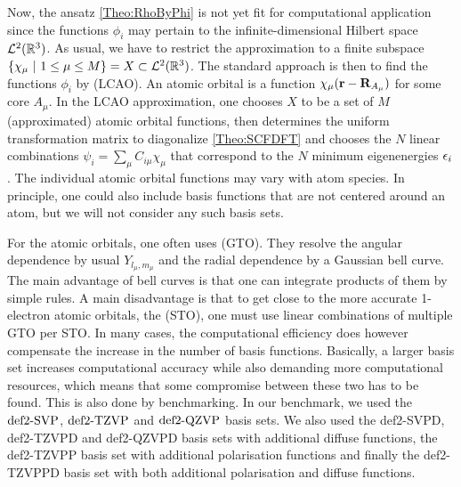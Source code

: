 \documentclass[8.5pt,twoside,twocolumn]{article}
\renewcommand\r{\bo r}
\theoremstyle{standard}
\begin{document}
Now, the ansatz \eqref{Theo:RhoByPhi} is not yet fit for computational application since the
functions $\phi_i$ may pertain to the infinite-dimensional Hilbert space $\mathcal L^2(\mathbb{R}^3)$.
As usual, we have to restrict the approximation to a finite subspace 
$\left\{{\chi_\mu\ |\ 1 \le \mu \le M} \right\} = X \subset \mathcal L^2(\mathbb{R}^3)$.
The standard approach is then to find the functions $\phi_i$ by  (LCAO). An atomic orbital is a function $\chi_\mu(\r - \bo R_{A_\mu})$
for some core $A_\mu$. In the LCAO approximation, one chooses $X$ to be a set of $M$ (approximated) atomic orbital
functions, then determines the uniform transformation matrix to diagonalize \eqref{Theo:SCFDFT}
and chooses the $N$ linear combinations $\psi_i=\sum_\mu C_{i \mu} \chi_\mu$ that correspond to the $N$ minimum
eigenenergies $\epsilon_i$. The individual atomic orbital functions may vary with atom species. In principle,
one could also include basis functions that are not centered around an atom, but we will
not consider any such basis sets.

For the atomic orbitals, one often uses  (GTO). They resolve the
angular dependence by usual  $Y_{l_\mu,m_\mu}$ and the
radial dependence by a Gaussian bell curve. The main advantage of bell curves is that one can integrate products
of them by simple rules. A main disadvantage
is that to get close to the more accurate 1-electron atomic orbitals, the 
(STO), one must use linear combinations of multiple GTO per STO. In many cases, the computational
efficiency does however compensate the increase in the number of basis functions.
Basically, a larger basis set increases computational accuracy while also demanding more
computational resources, which means that some compromise between these two has to
be found. This is also done by benchmarking. In our benchmark, we used the
$\text{def2-SVP}$\cite{SchaeferHornAhlrichs1992},
$\text{def2-TZVP}$\cite{WeigendHaeserPatzeltEtAl1998} and
$\text{def2-QZVP}$\cite{WeigendFurcheAhlrichs2003} basis sets. We also used the def2-SVPD,
def2-TZVPD and def2-QZVPD basis sets with additional diffuse
functions\cite{RappoportFurche2010}, the
def2-TZVPP\cite{WeigendHaeserPatzeltEtAl1998} basis set with additional
polarisation functions and finally the def2-TZVPPD\cite{RappoportFurche2010}
basis set with both additional polarisation and diffuse functions.
\end{document}
